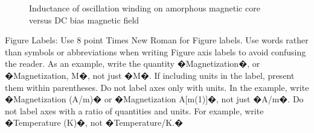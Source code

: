 \documentclass[letterpaper, 10 pt, conference]{ieeeconf}  %
\begin{document}




   \begin{figure}[thpb]
      \centering
      \caption{Inductance of oscillation winding on amorphous
       magnetic core versus DC bias magnetic field}
      \label{figurelabel}
   \end{figure}
   

Figure Labels: Use 8 point Times New Roman for Figure labels. Use words rather than symbols or abbreviations when writing Figure axis labels to avoid confusing the reader. As an example, write the quantity �Magnetization�, or �Magnetization, M�, not just �M�. If including units in the label, present them within parentheses. Do not label axes only with units. In the example, write �Magnetization (A/m)� or �Magnetization {A[m(1)]}�, not just �A/m�. Do not label axes with a ratio of quantities and units. For example, write �Temperature (K)�, not �Temperature/K.�
\end{document}
